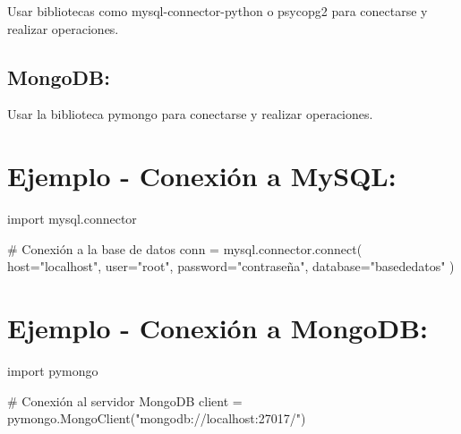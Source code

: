 \documentclass[
  a4paper,
  DIV=11,
  numbers=noendperiod,
  onepage,
  openany]{scrreprt}
\newenvironment{Shaded}{\begin{snugshade}}{\end{snugshade}}
\newcommand{\CommentTok}[1]{\textcolor[rgb]{0.37,0.37,0.37}{#1}}
\newcommand{\ExtensionTok}[1]{\textcolor[rgb]{0.00,0.23,0.31}{#1}}
\newcommand{\ImportTok}[1]{\textcolor[rgb]{0.00,0.46,0.62}{#1}}
\newcommand{\NormalTok}[1]{\textcolor[rgb]{0.00,0.23,0.31}{#1}}
\newcommand{\OperatorTok}[1]{\textcolor[rgb]{0.37,0.37,0.37}{#1}}
\newcommand{\StringTok}[1]{\textcolor[rgb]{0.13,0.47,0.30}{#1}}
\begin{document}
Usar bibliotecas como mysql-connector-python o psycopg2 para conectarse
y realizar operaciones.

\hypertarget{mongodb-1}{%
\subsection{MongoDB:}\label{mongodb-1}}

Usar la biblioteca pymongo para conectarse y realizar operaciones.

\hypertarget{ejemplo---conexiuxf3n-a-mysql-1}{%
\section{Ejemplo - Conexión a
MySQL:}\label{ejemplo---conexiuxf3n-a-mysql-1}}

\begin{Shaded}
\begin{Highlighting}[]
\ImportTok{import}\NormalTok{ mysql.connector}

\CommentTok{\# Conexión a la base de datos}
\NormalTok{conn }\OperatorTok{=}\NormalTok{ mysql.connector.}\ExtensionTok{connect}\NormalTok{(}
\NormalTok{    host}\OperatorTok{=}\StringTok{"localhost"}\NormalTok{,}
\NormalTok{    user}\OperatorTok{=}\StringTok{"root"}\NormalTok{,}
\NormalTok{    password}\OperatorTok{=}\StringTok{"contraseña"}\NormalTok{,}
\NormalTok{    database}\OperatorTok{=}\StringTok{"basededatos"}
\NormalTok{)}
\end{Highlighting}
\end{Shaded}

\hypertarget{ejemplo---conexiuxf3n-a-mongodb-1}{%
\section{Ejemplo - Conexión a
MongoDB:}\label{ejemplo---conexiuxf3n-a-mongodb-1}}

\begin{Shaded}
\begin{Highlighting}[]
\ImportTok{import}\NormalTok{ pymongo}

\CommentTok{\# Conexión al servidor MongoDB}
\NormalTok{client }\OperatorTok{=}\NormalTok{ pymongo.MongoClient(}\StringTok{"mongodb://localhost:27017/"}\NormalTok{)}
\end{Highlighting}
\end{Shaded}
\end{document}

